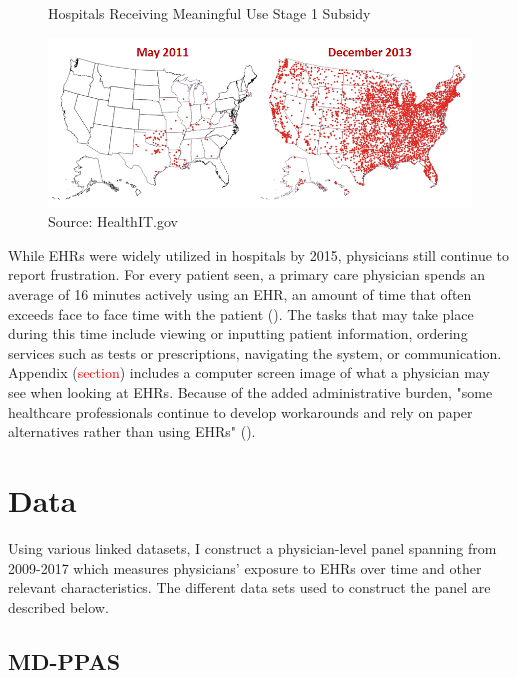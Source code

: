 \documentclass[11pt]{article}
\begin{document}
\vspace{3mm}
\begin{figure}[ht]
    \centering
    \caption{Hospitals Receiving Meaningful Use Stage 1 Subsidy}
    \includegraphics[scale=.6]{Objects/QS-Hospitals-Receiving-Payments-for-MU-and-Adoption.png}
    \caption*{Source: HealthIT.gov}
    \label{fig:meanuse}
\end{figure}
\vspace{3mm}

While EHRs were widely utilized in hospitals by 2015, physicians still continue to report frustration. For every patient seen, a primary care physician spends an average of 16 minutes actively using an EHR, an amount of time that often exceeds face to face time with the patient (\cite{overhage2020physician}). The tasks that may take place during this time include viewing or inputting patient information, ordering services such as tests or prescriptions, navigating the system, or communication. Appendix (\textcolor{red}{section}) includes a computer screen image of what a physician may see when looking at EHRs. Because of the added administrative burden, "some healthcare professionals continue to develop workarounds and rely on paper alternatives rather than using EHRs" (\cite{evans2016electronic}).

\section{Data}

Using various linked datasets, I construct a physician-level panel spanning from 2009-2017 which measures physicians' exposure to EHRs over time and other relevant characteristics. The different data sets used to construct the panel are described below.

\subsection{MD-PPAS}
\end{document}
